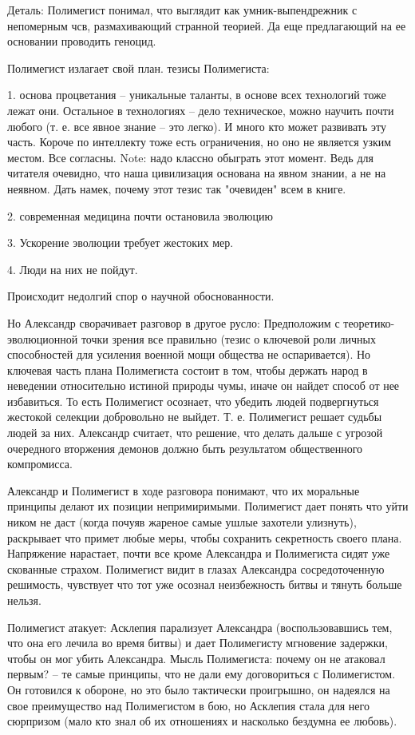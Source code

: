 \documentclass[12pt,a4paper]{article}
\begin{document}
Деталь: Полимегист понимал, что выглядит как умник-выпендрежник с непомерным чсв, размахивающий странной теорией. Да еще предлагающий на ее основании проводить геноцид.

Полимегист излагает свой план.
тезисы Полимегиста:

1. основа процветания -- уникальные таланты, в основе всех технологий тоже лежат они. Остальное в технологиях -- дело техническое, можно научить почти любого (т. е. все явное знание -- это легко). И много кто может развивать эту часть. Короче по интеллекту тоже есть ограничения, но оно не является узким местом. Все согласны. Note: надо классно обыграть этот момент. Ведь для читателя очевидно, что наша цивилизация основана на явном знании, а не на неявном. Дать намек, почему этот тезис так "очевиден" всем в книге.

2. современная медицина почти остановила эволюцию

3. Ускорение эволюции требует жестоких мер.

4. Люди на них не пойдут.

Происходит недолгий спор о научной обоснованности.

Но Александр сворачивает разговор в другое русло: Предположим с теоретико-эволюционной точки зрения все правильно (тезис о ключевой роли личных способностей для усиления военной мощи общества не оспаривается). Но ключевая часть плана Полимегиста состоит в том, чтобы держать народ в неведении относительно истиной природы чумы, иначе он найдет способ от нее избавиться. То есть Полимегист осознает, что убедить людей подвергнуться жестокой селекции добровольно не выйдет. Т. е. Полимегист решает судьбы людей за них. Александр считает, что решение, что делать дальше с угрозой очередного вторжения демонов должно быть результатом общественного компромисса.

Александр и Полимегист в ходе разговора понимают, что их моральные принципы делают их позиции непримиримыми. Полимегист дает понять что уйти ником не даст (когда почуяв жареное самые ушлые захотели улизнуть), раскрывает что примет любые меры, чтобы сохранить секретность своего плана. Напряжение нарастает, почти все кроме Александра и Полимегиста сидят уже скованные страхом. Полимегист видит в глазах Александра сосредоточенную решимость, чувствует что тот уже осознал неизбежность битвы и тянуть больше нельзя.

Полимегист атакует: Асклепия парализует Александра (воспользовавшись тем, что она его лечила во время битвы) и дает Полимегисту мгновение задержки, чтобы он мог убить Александра. Мысль Полимегиста: почему он не атаковал первым? -- те самые принципы, что не дали ему договориться с Полимегистом. Он готовился к обороне, но это было тактически проигрышно, он надеялся на свое преимущество над Полимегистом в бою, но Асклепия стала для него сюрпризом (мало кто знал об их отношениях и насколько бездумна ее любовь).
\end{document}
